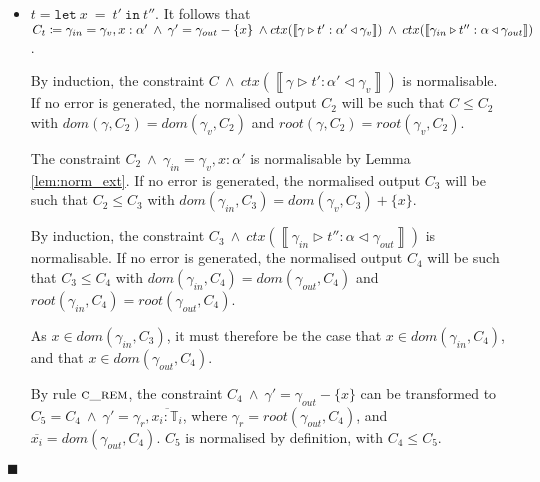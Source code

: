 \documentclass[preprint]{sigplanconf}
\newcommand{\lemref}[1]{Lemma \ref{#1}}
\newcommand{\inferrule}[4]{\left\llbracket #1 \triangleright #2 : #3 \triangleleft #4 \right\rrbracket}
\newcommand{\lett}[3]{\mathtt{let}\:#1\:\mathtt{=}\:#2\:\mathtt{in}\:#3}
\newcommand{\cand}{\:\wedge\:}
\newcommand{\tinf}{\mathbb{T}}
\newcommand{\qed}{$\blacksquare$}
\newenvironment{proof}{\vspace{1ex}\noindent{\bf Proof}\hspace{0.5em}}
  {\hfill\qed\vspace{1ex}}
\begin{document}
\begin{proof}
\begin{itemize}
Let $C_3$ be the constraint 
$C_2 \cand \gamma_r = \emptyset \cand \gamma_{in} = \gamma_r, \overline{x_i : \alpha_i}$.
$C_3$ is normalised by definition, with $C_2 \leq C_3$.

The constraint $C_3 \cand ctx(\inferrule{\gamma_{in}}{t'}{\alpha}{\gamma_{out}})$
is normalisable by induction. Let $C_4$ be the normalised output, where
$C_3 \leq C_4$.

Let $C_5$ be the constraint 
$C_4 \cand \overline{x_i : \alpha_i' \in \gamma_{out}}$.
This constraint is normalisable by repeated application of 
\lemref{lem:norm_usage}. If no error is generated, the normalised constraint 
$C_5$ will be produced, where $C_4 \leq C_5$.

Transitively, $C \leq C_5$. It is also the case that $C_2 \leq C_5$, therefore 
$dom(\gamma, C_5) = dom(\gamma', C_5)$ and
$root(\gamma, C_5) = root(\gamma', C_5)$.

\item $t = \lett{x}{t'}{t''}$.
It follows that \\
$C_t \coloneqq \gamma_{in} = \gamma_v, x : \alpha' \cand 
\gamma' = \gamma_{out} - \{x\} \cand \\
ctx(\inferrule{\gamma}{t'}{\alpha'}{\gamma_v}) \cand
ctx(\inferrule{\gamma_{in}}{t''}{\alpha}{\gamma_{out}})$.

By induction, the constraint 
$C \cand ctx(\inferrule{\gamma}{t'}{\alpha'}{\gamma_v})$ is normalisable.
If no error is generated, the normalised output $C_2$ will be such that
$C \leq C_2$ with $dom(\gamma, C_2) = dom(\gamma_v, C_2)$ and
$root(\gamma, C_2) = root(\gamma_v, C_2)$.

The constraint $C_2 \cand \gamma_{in} = \gamma_v, x : \alpha'$ is
normalisable by \lemref{lem:norm_ext}. If no error is generated, the
normalised output $C_3$ will be such that $C_2 \leq C_3$ with 
$dom(\gamma_{in}, C_3) = dom(\gamma_v, C_3) + \{ x \}$.

By induction, the constraint
$C_3 \cand ctx(\inferrule{\gamma_{in}}{t''}{\alpha}{\gamma_{out}})$
is normalisable. If no error is generated, the normalised output $C_4$
will be such that
$C_3 \leq C_4$ with $dom(\gamma_{in}, C_4) = dom(\gamma_{out}, C_4)$
and $root(\gamma_{in}, C_4) = root(\gamma_{out}, C_4)$.

As $x \in dom(\gamma_{in}, C_3)$, it must therefore be the case that
$x \in dom(\gamma_{in}, C_4)$, and that $x \in dom(\gamma_{out}, C_4)$.

By rule $\textsc{c\_rem}$, the constraint
$C_4 \cand \gamma' = \gamma_{out} - \{ x \}$ can be transformed
to $C_5 = C_4 \cand \gamma' = \gamma_r, \overline{x_i : \tinf_i}$, where
$\gamma_r = root(\gamma_{out}, C_4)$, and 
$\overline{x_i} = dom(\gamma_{out}, C_4)$. $C_5$ is normalised by definition,
with $C_4 \leq C_5$.


\end{itemize}
\end{proof}
\end{document}
